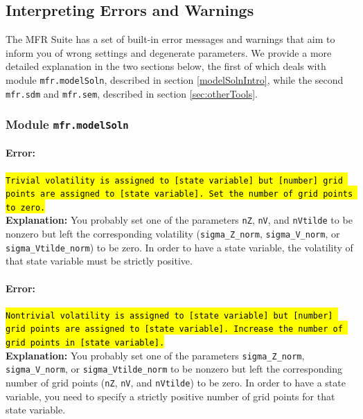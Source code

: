 \documentclass[12pt]{article}
\newcommand{\softwareShortName}{MFR Suite\xspace}
\newcommand{\modelSolnProg}{mfr.modelSoln\xspace}
\newcommand{\sdmProg}{mfr.sdm\xspace}
\newcommand{\semProg}{mfr.sem\xspace}
\newcommand{\growthVolProg}{sigma\_Z\_norm\xspace}
\newcommand{\stochasticVolVolProg}{sigma\_V\_norm\xspace}
\newcommand{\idioVolVolProg}{sigma\_Vtilde\_norm\xspace}
\newcommand{\nGrowthProg}{nZ\xspace}
\newcommand{\nStochasaticVolProg}{nV\xspace}
\newcommand{\nIdioVolProg}{nVtilde\xspace}
\begin{document}
\subsection{Interpreting Errors and Warnings}\label{secton:errorMsg}

The \softwareShortName has a set of built-in error messages and warnings that aim to inform you of wrong settings and degenerate parameters. We provide a more detailed explanation in the two sections below, the first of which deals with module \texttt{\modelSolnProg}, described in section \ref{modelSolnIntro}, while the second \texttt{\sdmProg} and \texttt{\semProg}, described in section \ref{sec:otherTools}.

\subsubsection{Module \texttt{\modelSolnProg}}

\paragraph{Error:} \hl{\texttt{Trivial volatility is assigned to [state variable] but [number] grid points are assigned to [state variable]. Set the number of grid points to zero.}}\\

\textbf{Explanation:} You probably set one of the parameters \texttt{\nGrowthProg}, \texttt{\nStochasaticVolProg}, and \texttt{\nIdioVolProg} to be nonzero but left the corresponding volatility (\texttt{\growthVolProg}, \texttt{\stochasticVolVolProg}, or \texttt{\idioVolVolProg}) to be zero. In order to have a state variable, the volatility of that state variable must be strictly positive.

\paragraph{Error:} \hl{\texttt{Nontrivial volatility is assigned to [state variable] but [number] grid points are assigned to [state variable]. Increase the number of grid points in  [state variable].}}\\

\textbf{Explanation:} You probably set one of the parameters \texttt{\growthVolProg}, \texttt{\stochasticVolVolProg}, or \texttt{\idioVolVolProg} to be nonzero but left the corresponding number of grid points (\texttt{\nGrowthProg}, \texttt{\nStochasaticVolProg}, and \texttt{\nIdioVolProg}) to be zero. In order to have a state variable, you need to specify a strictly positive number of grid points for that state variable.
\end{document}
